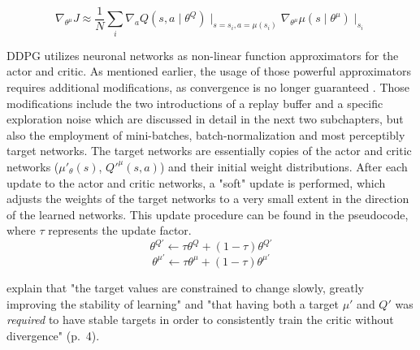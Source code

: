 \begin{equation*}
                    \nabla_{\theta^\mu} J \approx \frac{1}{N}
                    \sum_i{\nabla_a Q(s, a \mid \theta^Q) 
                    \mid_{s = s_i, a=\mu(s_i)} \nabla_{\theta^\mu} \mu(s \mid \theta^\mu) \mid_{s_i}}
\end{equation*}
\par
DDPG utilizes neuronal networks as non-linear function approximators for the actor and critic. As mentioned earlier, the usage of those powerful approximators requires additional modifications, as convergence is no longer guaranteed \cite[p.3]{lillicrap2019continuous}. Those modifications include the two introductions of a replay buffer and a specific exploration noise which are discussed in detail in the next two subchapters, but also the employment of mini-batches, batch-normalization and most perceptibly target networks. The target networks are essentially copies of the actor and critic networks ($\mu'_\theta(s)$, $Q'^\mu(s,a)$) and their initial weight distributions. After each update to the actor and critic networks, a "soft" update is performed, which adjusts the weights of the target networks to a very small extent in the direction of the learned networks. This update procedure can be found in the pseudocode, where $\tau$ represents the update factor.
    \begin{equation*}
                    \theta^{Q'} \leftarrow \tau \theta^Q
 + (1- \tau) \theta^{Q'}                \end{equation*}
 \begin{equation*}
                    \theta^{\mu'} \leftarrow \tau \theta^\mu
 + (1- \tau) \theta^{\mu'}                
 \end{equation*}


\cite{lillicrap2019continuous} explain that "the target values are constrained to change slowly, greatly improving the stability of learning" and "that having both a target $\mu'$ and $Q'$ was \textit{required} to have stable targets in order to consistently train the critic without divergence" (p.~4).